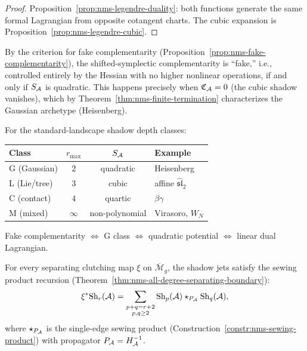 \begin{proof}
Proposition~\ref{prop:nms-legendre-duality}: both functions
generate the same formal Lagrangian from opposite cotangent
charts. The cubic expansion is
Proposition~\ref{prop:nms-legendre-cubic}.
\end{proof}

\begin{remark}
\label{rem:thqg-III-shadow-depth}
By the criterion for fake complementarity
(Proposition~\ref{prop:nms-fake-complementarity}), the
shifted-symplectic complementarity is ``fake,'' i.e.,
controlled entirely by the Hessian with no higher nonlinear
operations, if and only if $S_{\mathcal{A}}$ is quadratic.
This happens precisely when $\mathfrak{C}_{\mathcal{A}} = 0$
(the cubic shadow vanishes), which by
Theorem~\ref{thm:nms-finite-termination} characterizes
the Gaussian archetype (Heisenberg).

For the standard-landscape shadow depth classes:
\begin{center}
\renewcommand{\arraystretch}{1.2}
\begin{tabular}{l@{\quad}c@{\quad}c@{\quad}l}
\textbf{Class} & $r_{\max}$ & $S_{\mathcal{A}}$ & \textbf{Example} \\
\midrule
G (Gaussian) & $2$ & quadratic & Heisenberg \\
L (Lie/tree) & $3$ & cubic & affine $\widehat{\mathfrak{sl}}_2$ \\
C (contact) & $4$ & quartic & $\beta\gamma$ \\
M (mixed) & $\infty$ & non-polynomial & Virasoro, $W_N$ \\
\end{tabular}
\end{center}
Fake complementarity $\Leftrightarrow$ G class
$\Leftrightarrow$ quadratic potential $\Leftrightarrow$
linear dual Lagrangian.
\end{remark}

\begin{proposition}
\label{prop:thqg-III-sewing-recursion}
For every separating clutching map $\xi$ on
$\overline{\mathcal{M}}_g$, the shadow jets satisfy the
sewing product recursion
\textup{(}Theorem~\textup{\ref{thm:nms-all-degree-separating-boundary})}:
\begin{equation}\label{eq:thqg-III-sewing-recursion}
\xi^* \mathrm{Sh}_r(\mathcal{A})
=
\sum_{\substack{p + q = r + 2 \\ p, q \ge 2}}
\mathrm{Sh}_p(\mathcal{A}) \star_{P_{\mathcal{A}}} \mathrm{Sh}_q(\mathcal{A}),
\end{equation}
where $\star_{P_{\mathcal{A}}}$ is the single-edge sewing product
\textup{(}Construction~\textup{\ref{constr:nms-sewing-product})}
with propagator $P_{\mathcal{A}} = H_{\mathcal{A}}^{-1}$.
\end{proposition}

